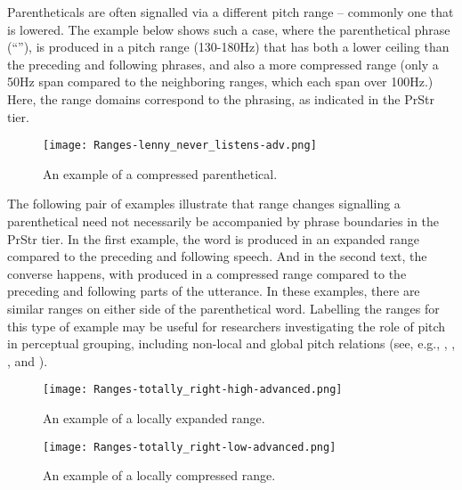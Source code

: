 Parentheticals are often signalled via a different pitch range – commonly one that is lowered. The example below shows such a case, where the parenthetical phrase (“”), is produced in a pitch range (130-180Hz) that has both a lower ceiling than the preceding and following phrases, and also a more compressed range (only a 50Hz span compared to the neighboring ranges, which each span over 100Hz.) Here, the range domains correspond to the phrasing, as indicated in the PrStr tier.

\begin{figure}[H]
\centering
%
\texttt{[image: Ranges-lenny\_never\_listens-adv.png]}
%
\caption{An example of a compressed parenthetical.%
\label{fig:lenny_never_listens Ranges Adv}%
}
\end{figure}

The following pair of examples illustrate that range changes signalling a parenthetical need not necessarily be accompanied by phrase boundaries in the PrStr tier. In the first example, the word  is produced in an expanded range compared to the preceding and following speech. And in the second text, the converse happens, with  produced in a compressed range compared to the preceding and following parts of the utterance. In these examples, there are similar ranges on either side of the parenthetical word. Labelling the ranges for this type of example may be useful for researchers investigating the role of pitch in perceptual grouping, including non-local and global pitch relations (see, e.g., \citealt{ladd88}, \citealt{geluykensswerts93, geluykensswerts94}, \citealt{brugos09}, and \citealt{kentnerfery13}).%

\begin{figure}[H]
\centering
%
\texttt{[image: Ranges-totally\_right-high-advanced.png]}
%
\caption{An example of a locally expanded range.%
\label{fig:totally_right-high Ranges Adv}%
}
\end{figure}

\begin{figure}[H]
\centering
%
\texttt{[image: Ranges-totally\_right-low-advanced.png]}
%
\caption{An example of a locally compressed range.%
\label{fig:totally_right-low Ranges Adv}%
}
\end{figure}


